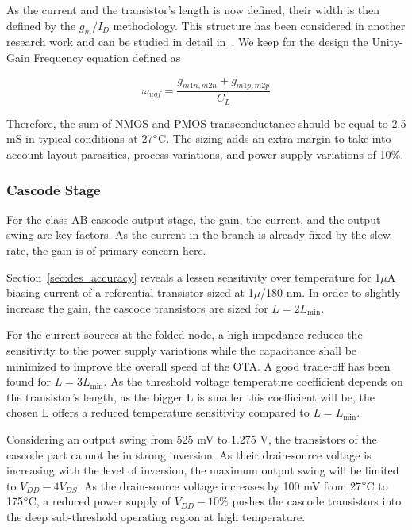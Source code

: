 As the current and the transistor's length is now defined, their width is then defined by the \(g_m/I_D \) methodology. This structure has been considered in another research work and can be studied in detail in~\cite{Vallee1994,Lipka2009,Hati2012}. We keep for the design the Unity-Gain Frequency equation defined as

\begin{equation}
\omega_{ugf} = \frac{g_{m1n,m2n} + g_{m1p,m2p}}{C_L}
\end{equation}

Therefore, the sum of NMOS and PMOS transconductance should be equal to 2.5 mS in typical conditions at 27\(\degree \)C. The sizing adds an extra margin to take into account layout parasitics, process variations, and power supply variations of 10\%.

\subsubsection{Cascode Stage}
For the class AB cascode output stage, the gain, the current, and the output swing are key factors. As the current in the branch is already fixed by the slew-rate, the gain is of primary concern here.

Section~\ref{sec:des_accuracy} reveals a lessen sensitivity over temperature for 1\(\mu \)A biasing current of a referential transistor sized at 1\(\mu \)/180 nm. In order to slightly increase the gain, the cascode transistors are sized for \(L = 2 L_{\min} \).

For the current sources at the folded node, a high impedance reduces the sensitivity to the power supply variations while the capacitance shall be minimized to improve the overall speed of the OTA\@. A good trade-off has been found for \(L = 3 L_{\min} \). As the threshold voltage temperature coefficient depends on the transistor's length, as the bigger L is smaller this coefficient will be, the chosen L offers a reduced temperature sensitivity compared to \(L = L_{\min} \).

Considering an output swing from 525 mV to 1.275 V, the transistors of the cascode part cannot be in strong inversion. As their drain-source voltage is increasing with the level of inversion, the maximum output swing will be limited to \(V_{DD} - 4 V_{DS} \). As the drain-source voltage increases by 100 mV from 27\(\degree \)C to 175\(\degree \)C, a reduced power supply of \(V_{DD} - 10\% \) pushes the cascode transistors into the deep sub-threshold operating region at high temperature.

